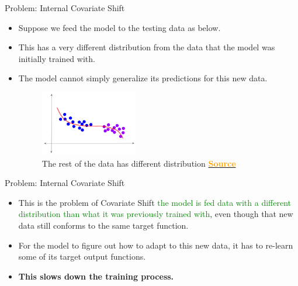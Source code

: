 \documentclass[serif, aspectratio=169]{beamer}
\begin{document}
\begin{frame}{Problem: Internal Covariate Shift}

\begin{itemize}

    \item Suppose we feed the model to the testing data as below.
    \item This has a very different distribution from the data that the model was initially trained with.
    \item The model cannot simply generalize its predictions for this new data.

    \begin{figure}
        \includegraphics[width=0.4\textwidth]{pic/ICS-4.png}
        \caption{The rest of the data has different distribution \href{https://ketanhdoshi.github.io/assets/images/BatchNorm/ICS-4.png}{\textcolor{orange}{\textbf{Source}}}}
        \label{fig:Rest_data_distribution}
    \end{figure}

\end{itemize}

\end{frame}

\begin{frame}{Problem: Internal Covariate Shift}
    
\begin{itemize}
    \item This is the problem of Covariate Shift \textcolor{green}{the model is fed data with a different distribution than what it was previously trained with}, even though that new data still conforms to the same target function.

    \item For the model to figure out how to adapt to this new data, it has to re-learn some of its target output functions.
    \item \textbf{This slows down the training process.}
    
\end{itemize}

\end{frame}
\end{document}
